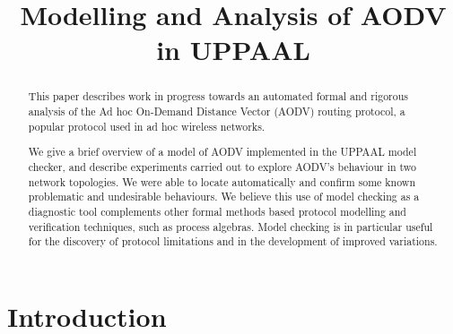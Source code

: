 \documentclass[conference,twoside]{IEEEtran}
\begin{document}
\title{Modelling and Analysis of AODV in UPPAAL}

\author{

}

\maketitle

\begin{abstract}
This paper describes work in progress towards an
automated formal and rigorous analysis of the Ad hoc On-Demand Distance Vector
(AODV) routing protocol, a
popular protocol used in ad hoc wireless networks.

We give a brief overview of a model of AODV implemented in the  UPPAAL model checker,
and describe experiments carried out to explore AODV's behaviour in two
network topologies. We were able  to locate automatically  and confirm
some known problematic and undesirable behaviours.
We believe this use of model checking as a diagnostic tool complements other formal methods based protocol modelling and verification techniques,
such as process algebras.
Model checking is in particular useful for the discovery of protocol limitations and in the development of improved variations.

\end{abstract}

\section{Introduction}
\label{sec:intro}
\end{document}
